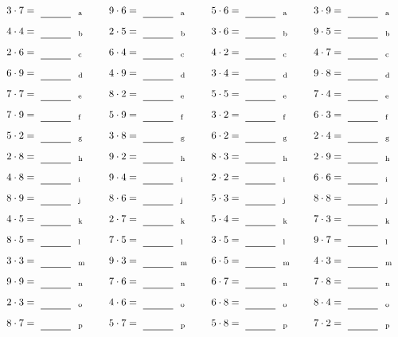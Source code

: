 \documentclass
[
  draft    = true,
  fontsize = 11pt,
  parskip  = half-
]
{scrartcl}
\begin{document}
\par\vfill\par
\begin{align*}
    \pline{3\cdot7}&=\rline{a}
  & \pline{9\cdot6}&=\rline{a}
  & \pline{5\cdot6}&=\rline{a}
  & \pline{3\cdot9}&=\rline{a} \\[1ex]
    \pline{4\cdot4}&=\rline{b}
  & \pline{2\cdot5}&=\rline{b}
  & \pline{3\cdot6}&=\rline{b}
  & \pline{9\cdot5}&=\rline{b} \\[1ex]
    \pline{2\cdot6}&=\rline{c}
  & \pline{6\cdot4}&=\rline{c}
  & \pline{4\cdot2}&=\rline{c}
  & \pline{4\cdot7}&=\rline{c} \\[1ex]
    \pline{6\cdot9}&=\rline{d}
  & \pline{4\cdot9}&=\rline{d}
  & \pline{3\cdot4}&=\rline{d}
  & \pline{9\cdot8}&=\rline{d} \\[1ex]
    \pline{7\cdot7}&=\rline{e}
  & \pline{8\cdot2}&=\rline{e}
  & \pline{5\cdot5}&=\rline{e}
  & \pline{7\cdot4}&=\rline{e} \\[1ex]
    \pline{7\cdot9}&=\rline{f}
  & \pline{5\cdot9}&=\rline{f}
  & \pline{3\cdot2}&=\rline{f}
  & \pline{6\cdot3}&=\rline{f} \\[1ex]
    \pline{5\cdot2}&=\rline{g}
  & \pline{3\cdot8}&=\rline{g}
  & \pline{6\cdot2}&=\rline{g}
  & \pline{2\cdot4}&=\rline{g} \\[1ex]
    \pline{2\cdot8}&=\rline{h}
  & \pline{9\cdot2}&=\rline{h}
  & \pline{8\cdot3}&=\rline{h}
  & \pline{2\cdot9}&=\rline{h} \\[1ex]
    \pline{4\cdot8}&=\rline{i}
  & \pline{9\cdot4}&=\rline{i}
  & \pline{2\cdot2}&=\rline{i}
  & \pline{6\cdot6}&=\rline{i} \\[1ex]
    \pline{8\cdot9}&=\rline{j}
  & \pline{8\cdot6}&=\rline{j}
  & \pline{5\cdot3}&=\rline{j}
  & \pline{8\cdot8}&=\rline{j} \\[1ex]
    \pline{4\cdot5}&=\rline{k}
  & \pline{2\cdot7}&=\rline{k}
  & \pline{5\cdot4}&=\rline{k}
  & \pline{7\cdot3}&=\rline{k} \\[1ex]
    \pline{8\cdot5}&=\rline{l}
  & \pline{7\cdot5}&=\rline{l}
  & \pline{3\cdot5}&=\rline{l}
  & \pline{9\cdot7}&=\rline{l} \\[1ex]
    \pline{3\cdot3}&=\rline{m}
  & \pline{9\cdot3}&=\rline{m}
  & \pline{6\cdot5}&=\rline{m}
  & \pline{4\cdot3}&=\rline{m} \\[1ex]
    \pline{9\cdot9}&=\rline{n}
  & \pline{7\cdot6}&=\rline{n}
  & \pline{6\cdot7}&=\rline{n}
  & \pline{7\cdot8}&=\rline{n} \\[1ex]
    \pline{2\cdot3}&=\rline{o}
  & \pline{4\cdot6}&=\rline{o}
  & \pline{6\cdot8}&=\rline{o}
  & \pline{8\cdot4}&=\rline{o} \\[1ex]
    \pline{8\cdot7}&=\rline{p}
  & \pline{5\cdot7}&=\rline{p}
  & \pline{5\cdot8}&=\rline{p}
  & \pline{7\cdot2}&=\rline{p}
\end{align*}
\end{document}
